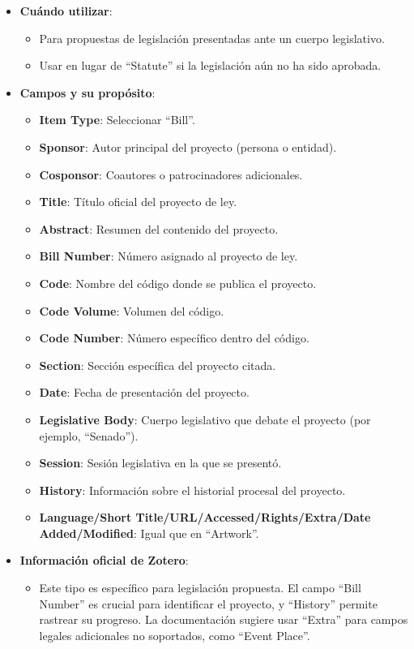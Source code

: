 \documentclass[
  jou,
  floatsintext,
  longtable,
  a4paper,
  nolmodern,
  notxfonts,
  notimes,
  12pt,
  colorlinks=true,linkcolor=blue,citecolor=blue,urlcolor=blue]{apa7}
\providecommand{\tightlist}{%
  \setlength{\itemsep}{0pt}\setlength{\parskip}{0pt}}
\begin{document}
\begin{itemize}
\tightlist
\item
  \textbf{Cuándo utilizar}:

  \begin{itemize}
  \tightlist
  \item
    Para propuestas de legislación presentadas ante un cuerpo
    legislativo.
  \item
    Usar en lugar de ``Statute'' si la legislación aún no ha sido
    aprobada.
  \end{itemize}
\item
  \textbf{Campos y su propósito}:

  \begin{itemize}
  \tightlist
  \item
    \textbf{Item Type}: Seleccionar ``Bill''.
  \item
    \textbf{Sponsor}: Autor principal del proyecto (persona o entidad).
  \item
    \textbf{Cosponsor}: Coautores o patrocinadores adicionales.
  \item
    \textbf{Title}: Título oficial del proyecto de ley.
  \item
    \textbf{Abstract}: Resumen del contenido del proyecto.
  \item
    \textbf{Bill Number}: Número asignado al proyecto de ley.
  \item
    \textbf{Code}: Nombre del código donde se publica el proyecto.
  \item
    \textbf{Code Volume}: Volumen del código.
  \item
    \textbf{Code Number}: Número específico dentro del código.
  \item
    \textbf{Section}: Sección específica del proyecto citada.
  \item
    \textbf{Date}: Fecha de presentación del proyecto.
  \item
    \textbf{Legislative Body}: Cuerpo legislativo que debate el proyecto
    (por ejemplo, ``Senado'').
  \item
    \textbf{Session}: Sesión legislativa en la que se presentó.
  \item
    \textbf{History}: Información sobre el historial procesal del
    proyecto.
  \item
    \textbf{Language/Short Title/URL/Accessed/Rights/Extra/Date
    Added/Modified}: Igual que en ``Artwork''.
  \end{itemize}
\item
  \textbf{Información oficial de Zotero}:

  \begin{itemize}
  \tightlist
  \item
    Este tipo es específico para legislación propuesta. El campo ``Bill
    Number'' es crucial para identificar el proyecto, y ``History''
    permite rastrear su progreso. La documentación sugiere usar
    ``Extra'' para campos legales adicionales no soportados, como
    ``Event Place''.
  \end{itemize}
\end{itemize}
\end{document}
